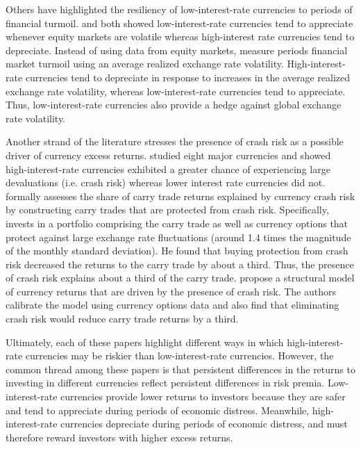 \documentclass{ar-1col}
\begin{document}
Others have highlighted the resiliency of low-interest-rate currencies to periods of financial turmoil. \citet{LustigRoussanovVerdelhan2011} and \citet{CampbellMedeirosViceira2010} both showed low-interest-rate currencies tend to appreciate whenever equity markets are volatile whereas high-interest rate currencies tend to depreciate. Instead of using data from equity markets, \citet{Menkhoffetal2012} measure periods financial market turmoil using an average realized exchange rate volatility. High-interest-rate currencies tend to depreciate in response to increases in the average realized exchange rate volatility, whereas low-interest-rate currencies tend to appreciate. Thus, low-interest-rate currencies also provide a hedge against global exchange rate volatility. 

Another strand of the literature stresses the presence of crash risk as a possible driver of currency excess returns. \citet{Brunnermeieretal2009} studied eight major currencies and showed high-interest-rate currencies exhibited a greater chance of experiencing large devaluations (i.e. crash risk) whereas lower interest rate currencies did not. \citet{Jurek2014} formally assesses the share of carry trade returns explained by currency crash risk by constructing carry trades that are protected from crash risk. Specifically, \citet{Jurek2014} invests in a portfolio comprising the carry trade as well as currency options that protect against large exchange rate fluctuations (around 1.4 times the magnitude of the monthly standard deviation). He found that buying protection from crash risk decreased the returns to the carry trade by about a third. Thus, the presence of crash risk explains about a third of the carry trade. \citet{Farhietal2015} propose a structural model of currency returns that are driven by the presence of crash risk. The authors calibrate the model using currency options data and also find that eliminating crash risk would reduce carry trade returns by a third.



Ultimately, each of these papers highlight different ways in which high-interest-rate currencies may be riskier than low-interest-rate currencies. However, the common thread among these papers is that persistent differences in the returns to investing in different currencies reflect persistent differences in risk premia. Low-interest-rate currencies provide lower returns to investors because they are safer and tend to appreciate during periods of economic distress. Meanwhile, high-interest-rate currencies depreciate during periods of economic distress, and must therefore reward investors with higher excess returns.
\end{document}
